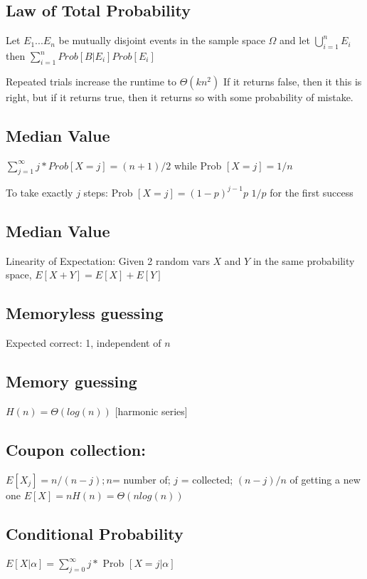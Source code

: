 \subsection{Law of Total Probability}
Let $E_1 ... E_n$ be mutually disjoint events in the sample space $\Omega$ and let $\bigcup\limits_{i=1}^{n} E_{i}$ then $\sum_{i=1}^{n}  Prob[ B | E_{i}] Prob[E_{i}] $ 

Repeated trials increase the runtime to $\Theta(kn^2)$
If it returns false, then it this is right, but if it returns true, then it returns so with some probability of mistake.


\subsection{Median Value}
$\sum_{j=1}^{\infty}  j * Prob[ X = j ]  = (n + 1) / 2$ while Prob $[X = j] = 1/n$

To take exactly $j$ steps: Prob $[X = j] = (1 - p)^{j - 1} p$
$1/p$ for the first success

\subsection{Median Value}
Linearity of Expectation: Given 2 random vars $X$ and $Y$ in the same probability space, $E [X + Y] = E[ X ] + E [ Y ] $

\subsection{Memoryless guessing}
Expected correct: 1, independent of $n$

\subsection{Memory guessing}
$H(n) = \Theta(log(n))$ [harmonic series]

\subsection{Coupon collection:}
$E[ X_{j}] = n / (n - j); n $= number of; $j$ = collected; $( n - j ) / n$ of getting a new one
$E[X] = nH(n) = \Theta(nlog(n))$

\subsection{Conditional Probability}
$E[ X | \alpha ] =  \sum_{j=0}^{\infty} j *$ Prob $[ X = j | \alpha]$


